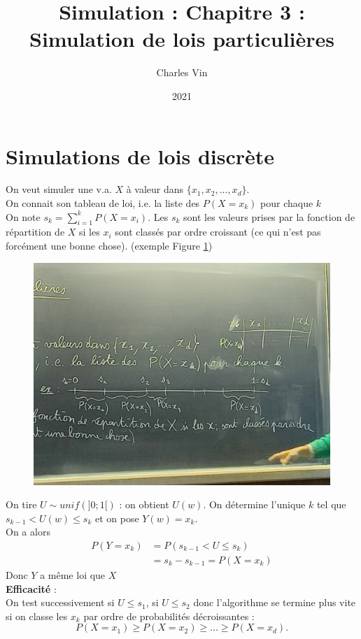 \documentclass{article}
\title{Simulation : Chapitre 3 : Simulation de lois particulières}
\author{Charles Vin}
\date{2021}
\theoremstyle{plain}%
\theoremstyle{definition}
\theoremstyle{remark}
\begin{document}
\maketitle

\section{Simulations de lois discrète}
On veut simuler une v.a. $ X $ à valeur dans $ \{x_1, x_2, ..., x_d\} $. \\
On connait son tableau de loi, i.e. la liste des $ P(X=x_k) $ pour chaque $ k $\\
On note $ s_k = \sum_{i=1}^{k}P(X=x_i) $. Les $ s_k $ sont les valeurs prises par la fonction de répartition de $ X $ si les $ x_i $ sont classés par ordre croissant (ce qui n'est pas forcément une bonne chose). (exemple Figure \ref{fig1})

\begin{figure}[!htbp]
	\centering
	\includegraphics*[width=.5\textwidth]{./figures3/fig1.jpg}
	\label{fig1}
\end{figure}

On tire $ U \sim unif(]0;1[) $ : on obtient $ U(w) $. On détermine l'unique $ k $ tel que $ s_{k-1} < U(w) \leq s_k $ et on pose $ Y(w) = x_k $. \\
On a alors 
\begin{align*}
	P(Y=x_k) &= P(s_{k-1} < U \leq s_k) \\
			&= s_k - s _{k-1} = P(X=x_k) 
\end{align*}
Donc $ Y $ a même loi que $ X $ \\

\textbf{Efficacité} : \\
On test successivement si $ U \leq s_1 $, si $ U \leq 
s_2 $ donc l'algorithme se termine plus vite si on classe les $ x_k $ par ordre de probabilités décroissantes : 
\[
	P(X=x_1) \geq P(X=x_2) \geq \dots \geq P(X=x_d)
.\]
\end{document}
